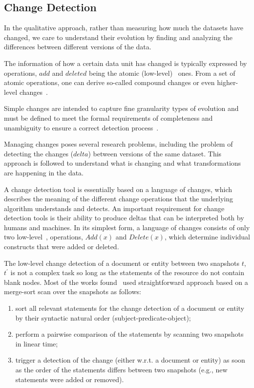 \documentclass[sw]{iosart2x}
\begin{document}
\subsection{Change Detection}

In the qualitative approach, rather than measuring how much the datasets have changed, we care to understand their evolution by finding and analyzing the differences between different versions of the data. 

The information of how a certain data unit has changed is typically expressed by operations, $add$ and $deleted$ being the atomic (low-level)~\cite{UmbrichHHPD10} ones. From a set of atomic operations, one can derive so-called compound changes or even higher-level changes~\cite{PapavasileiouFFKC13}.

Simple changes are intended to capture fine granularity types of evolution and must be defined to meet the formal requirements of completeness and unambiguity to ensure a correct detection process~\cite{PapavasileiouFFKC13}. 

Managing changes poses several research problems, including the problem of detecting the changes ($delta$) between versions of the same dataset. This approach is followed to understand what is changing and what transformations are happening in the data.

A change detection tool is essentially based on a language of changes, which describes the meaning of the different change operations that the underlying algorithm understands and detects. An important requirement for change detection tools is their ability to produce deltas that can be interpreted both by humans and machines. In its simplest form, a language of changes consists of only two low-level~\cite{UmbrichHHPD10}, \cite{KaferAUOH13} operations, $Add(x)$ and $Delete(x)$, which determine individual constructs that were added or deleted. 

The low-level change detection of a document or entity between two snapshots $t$, $t^\prime$ is not a complex task so long as the statements of the resource do not contain blank nodes. Most of the works found~\cite{UmbrichHHPD10} \cite{UmbrichKL10} used straightforward approach based on a merge-sort scan over the snapshots as follows:

\begin{enumerate}
	\item sort all relevant statements for the change detection of a document or entity by their syntactic natural order (subject-predicate-object);
	\item perform a pairwise comparison of the statements by scanning two snapshots in linear time;
	\item trigger a detection of the change (either w.r.t. a document or entity) as soon as the order of the statements differs between two snapshots (e.g., new statements were added or removed).
\end{enumerate}
\end{document}
